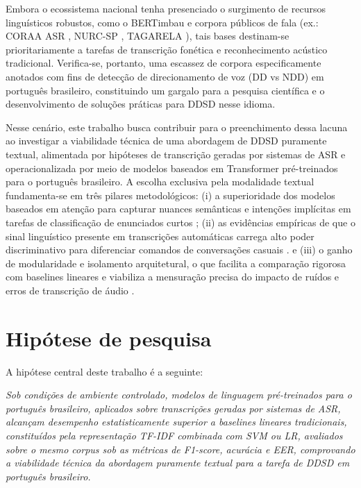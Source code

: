 \documentclass[
    12pt,                %
    openright,           %
    oneside,             %
    a4paper,             %
    english,             %
    brazil               %
]{abntex2}
\begin{document}
Embora o ecossistema nacional tenha presenciado o surgimento de recursos linguísticos robustos, como o BERTimbau \cite{Souza2020} e corpora públicos de fala (ex.: CORAA ASR \cite{CORAA2023}, NURC-SP \cite{NURCSP2025}, TAGARELA \cite{Tagarela2026}), tais bases destinam-se prioritariamente a tarefas de transcrição fonética e reconhecimento acústico tradicional. Verifica-se, portanto, uma escassez de corpora especificamente anotados com fins de detecção de direcionamento de voz (DD vs NDD) em português brasileiro, constituindo um gargalo para a pesquisa científica e o desenvolvimento de soluções práticas para DDSD nesse idioma.

Nesse cenário, este trabalho busca contribuir para o preenchimento dessa lacuna ao investigar a viabilidade técnica de uma abordagem de DDSD puramente textual, alimentada por hipóteses de transcrição geradas por sistemas de ASR e operacionalizada por meio de modelos baseados em Transformer pré-treinados para o português brasileiro. A escolha exclusiva pela modalidade textual fundamenta-se em três pilares metodológicos: (i) a superioridade dos modelos baseados em atenção para capturar nuances semânticas e intenções implícitas em tarefas de classificação de enunciados curtos \cite{Weld2022}; (ii) as evidências empíricas de que o sinal linguístico presente em transcrições automáticas carrega alto poder discriminativo para diferenciar comandos de conversações casuais \cite{Wagner2024, Dighe2024}. e (iii)  o ganho de modularidade e isolamento arquitetural, o que facilita a comparação rigorosa com baselines lineares e viabiliza a mensuração precisa do impacto de ruídos e erros de transcrição de áudio \cite{Dighe2024}.


\section{Hipótese de pesquisa}
\label{sec:hipotese}

A hipótese central deste trabalho é a seguinte: 

\textit{Sob condições de ambiente controlado, modelos de linguagem pré-treinados para o português brasileiro, aplicados sobre transcrições geradas por sistemas de ASR, alcançam desempenho estatisticamente superior a baselines lineares tradicionais, constituídos pela representação TF-IDF combinada com SVM ou LR, avaliados sobre o mesmo corpus sob as métricas de F1-score, acurácia e EER, comprovando a viabilidade técnica da abordagem puramente textual para a tarefa de DDSD em português brasileiro.}
\end{document}

